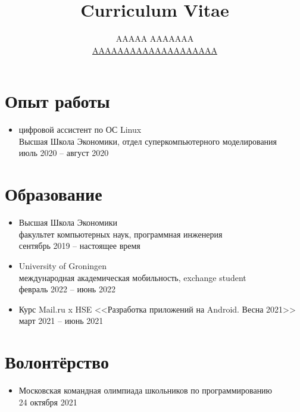 \documentclass[12pt]{article}
\title{Curriculum Vitae}
\author{AAAAA AAAAAAA \\ \href{mailto:AAAAAAAAAAAAAAAAAAAA}{AAAAAAAAAAAAAAAAAAAA}}
\begin{document}
  \maketitle

  \section{Опыт работы}
  \begin{itemize}
    \item цифровой ассистент по ОС Linux \\
      Высшая Школа Экономики, отдел суперкомпьютерного моделирования \\
      июль 2020 -- август 2020

  \end{itemize}

  \section{Образование}
  \begin{itemize}
    \item Высшая Школа Экономики \\
      факультет компьютерных наук, программная инженерия \\
      сентябрь 2019 -- настоящее время

    \item University of Groningen \\
      международная академическая мобильность, exchange student \\
      февраль 2022 -- июнь 2022

    \item Курс Mail.ru x HSE <<Разработка приложений на Android. Весна 2021>> \\
      март 2021 -- июнь 2021

  \end{itemize}

  \section{Волонтёрство}
  \begin{itemize}
    \item Московская командная олимпиада школьников по программированию \\
      24 октября 2021

  \end{itemize}
\end{document}
